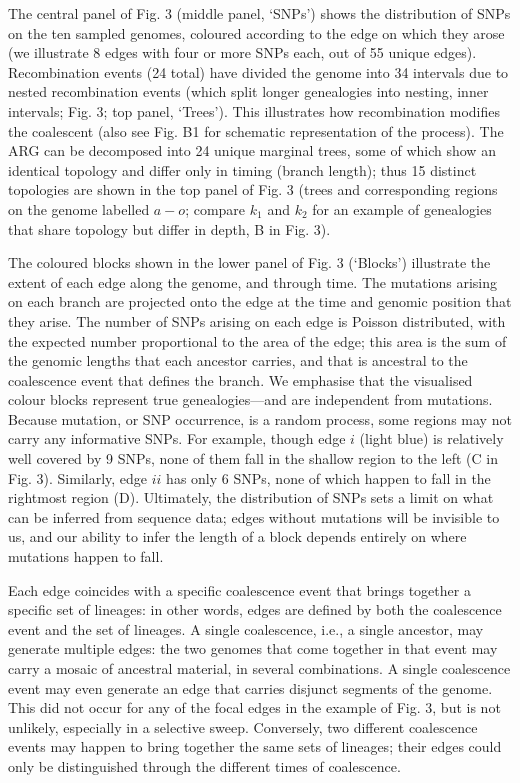 \documentclass[twocolumn]{bmcart}%
\begin{document}
The central panel of Fig. 3 (middle panel, ‘SNPs’) shows the distribution of SNPs on the ten sampled genomes, coloured according to the edge on which they arose (we illustrate 8 edges with four or more SNPs each, out of 55 unique edges). Recombination events (24 total) have divided the genome into 34 intervals due to nested recombination events (which split longer genealogies into nesting, inner intervals; Fig. 3; top panel, ‘Trees’). This illustrates how recombination modifies the coalescent (also see Fig. B1 for schematic representation of the process). The ARG can be decomposed into 24 unique marginal trees, some of which show an identical topology and differ only in timing (branch length); thus 15 distinct topologies are shown in the top panel of Fig. 3 (trees and corresponding regions on the genome labelled $a - o$; compare $k_1$ and $k_2$ for an example of genealogies that share topology but differ in depth, B in Fig. 3).  

The coloured blocks shown in the lower panel of Fig. 3 (‘Blocks’) illustrate the extent of each edge along the genome, and through time. The mutations arising on each branch are projected onto the edge at the time and genomic position that they arise. The number of SNPs arising on each edge is Poisson distributed, with the expected number proportional to the area of the edge; this area is the sum of the genomic lengths that each ancestor carries, and that is ancestral to the coalescence event that defines the branch. We emphasise that the visualised colour blocks represent true genealogies—and are independent from mutations. Because mutation, or SNP occurrence, is a random process, some regions may not carry any informative SNPs. For example, though edge $i$ (light blue) is relatively well covered by 9 SNPs, none of them fall in the shallow region to the left (C in Fig. 3). Similarly, edge $ii$ has only 6 SNPs, none of which happen to fall in the rightmost region (D). Ultimately, the distribution of SNPs sets a limit on what can be inferred from sequence data; edges without mutations will be invisible to us, and our ability to infer the length of a block depends entirely on where mutations happen to fall. 

Each edge coincides with a specific coalescence event that brings together a specific set of lineages: in other words, edges are defined by both the coalescence event and the set of lineages. A single coalescence, i.e., a single ancestor, may generate multiple edges: the two genomes that come together in that event may carry a mosaic of ancestral material, in several combinations. A single coalescence event may even generate an edge that carries disjunct segments of the genome. This did not occur for any of the focal edges in the example of Fig. 3, but is not unlikely, especially in a selective sweep. Conversely, two different coalescence events may happen to bring together the same sets of lineages; their edges could only be distinguished through the different times of coalescence.
\end{document}
